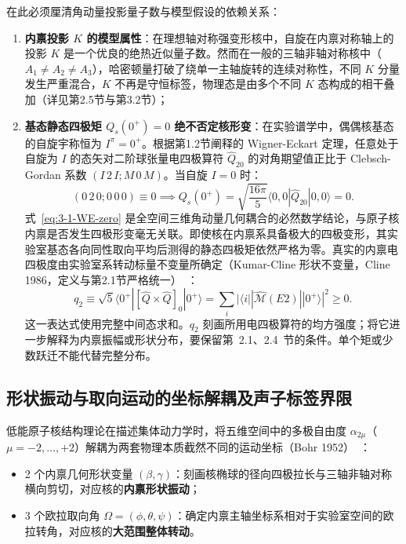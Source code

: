在此必须厘清角动量投影量子数与模型假设的依赖关系：
\begin{enumerate}
\item \textbf{内禀投影 $K$ 的模型属性}：在理想轴对称强变形核中，自旋在内禀对称轴上的投影 $K$ 是一个优良的绝热近似量子数。然而在一般的三轴非轴对称核中（$A_1 \ne A_2 \ne A_3$），哈密顿量打破了绕单一主轴旋转的连续对称性，不同 $K$ 分量发生严重混合，$K$ 不再是守恒标签，物理态是由多个不同 $K$ 态构成的相干叠加（详见第2.5节与第3.2节）；
\item \textbf{基态静态四极矩 $Q_s(0^+) = 0$ 绝不否定核形变}：在实验谱学中，偶偶核基态的自旋宇称恒为 $I^\pi = 0^+$。根据第1.2节阐释的 Wigner-Eckart 定理，任意处于自旋为 $I$ 的态矢对二阶球张量电四极算符 $\hat{Q}_{20}$ 的对角期望值正比于 Clebsch-Gordan 系数 $(I \, 2 \, I; M \, 0 \, M)$。当自旋 $I = 0$ 时：
\begin{equation}\label{eq:3-1-WE-zero}
(0 \, 2 \, 0; 0 \, 0 \, 0) \equiv 0 \implies Q_s(0^+) = \sqrt{\frac{16\pi}{5}} \langle 0, 0 | \hat{Q}_{20} | 0, 0 \rangle = 0.
\end{equation}
式~\eqref{eq:3-1-WE-zero} 是全空间三维角动量几何耦合的必然数学结论，与原子核内禀是否发生四极形变毫无关联。即使核在内禀系具备极大的四极变形，其实验室基态各向同性取向平均后测得的静态四极矩依然严格为零。真实的内禀电四极度由实验室系转动标量不变量所确定（Kumar-Cline 形状不变量，Cline 1986，定义与第2.1节严格统一）~\cite{cline-1986-nuclear-shapes-coulomb-excitation}：
\begin{equation}\label{eq:3-1-cline-invariant}
q_2 \equiv \sqrt{5} \langle 0^+ | [\hat{Q} \times \hat{Q}]_0 | 0^+ \rangle = \sum_i |\langle i || \hat{\mathcal{M}}(E2) || 0^+ \rangle|^2 \ge 0.
\end{equation}
这一表达式使用完整中间态求和。$q_2$ 刻画所用电四极算符的均方强度；将它进一步解释为内禀振幅或形状分布，要保留第~2.1、2.4~节的条件。单个矩或少数跃迁不能代替完整分布。
\end{enumerate}

\subsection{形状振动与取向运动的坐标解耦及声子标签界限}\label{sec:3-1-3}

低能原子核结构理论在描述集体动力学时，将五维空间中的多极自由度 $\alpha_{2\mu}$（$\mu = -2, \dots, +2$）解耦为两套物理本质截然不同的运动坐标（Bohr 1952）~\cite{bohr-1952-surface-particle-coupling}：
\begin{itemize}
\item 2 个内禀几何形状变量 $(\beta, \gamma)$：刻画核椭球的径向四极拉长与三轴非轴对称横向剪切，对应核的\textbf{内禀形状振动}；
\item 3 个欧拉取向角 $\Omega = (\phi, \theta, \psi)$：确定内禀主轴坐标系相对于实验室空间的欧拉转角，对应核的\textbf{大范围整体转动}。
\end{itemize}

